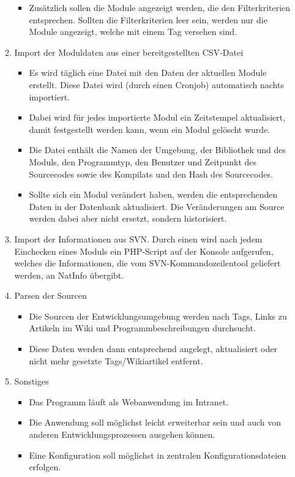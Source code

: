 \begin{enumerate}[itemsep=0em,partopsep=0em,parsep=0em,topsep=0em]
\begin{enumerate}
\begin{itemize}
		\item Zusätzlich sollen die Module angezeigt werden, die den Filterkriterien entsprechen. Sollten die Filterkriterien leer sein, werden nur die Module angezeigt, welche mit einem Tag versehen sind.
		\end{itemize}
	\item Import der Moduldaten aus einer bereitgestellten \acs{CSV}-Datei
		\begin{itemize}
		\item Es wird täglich eine Datei mit den Daten der aktuellen Module erstellt. Diese Datei wird (durch einen Cronjob) automatisch nachts importiert.
		\item Dabei wird für jedes importierte Modul ein Zeitstempel aktualisiert, damit festgestellt werden kann, wenn ein Modul gelöscht wurde.
		\item Die Datei enthält die Namen der Umgebung, der Bibliothek und des Moduls, den Programmtyp, den Benutzer und Zeitpunkt des Sourcecodes sowie des Kompilats und den Hash des Sourcecodes.
		\item Sollte sich ein Modul verändert haben, werden die entsprechenden Daten in der Datenbank aktualisiert. Die Veränderungen am Source werden dabei aber nicht ersetzt, sondern historisiert.
		\end{itemize}
	\item Import der Informationen aus SVN. Durch einen  wird nach jedem Einchecken eines Moduls ein \acs{PHP}-Script auf der Konsole aufgerufen, welches die Informationen, die vom SVN-Kommandozeilentool geliefert werden, an NatInfo übergibt.
	\item Parsen der Sourcen
		\begin{itemize}
		\item Die Sourcen der Entwicklungsumgebung werden nach Tags, Links zu Artikeln im Wiki und Programmbeschreibungen durchsucht.
		\item Diese Daten werden dann entsprechend angelegt, aktualisiert oder nicht mehr gesetzte Tags/Wikiartikel entfernt.
		\end{itemize}
	\item Sonstiges
		\begin{itemize}
		\item Das Programm läuft als Webanwendung im Intranet.
		\item Die Anwendung soll möglichst leicht erweiterbar sein und auch von anderen Entwicklungsprozessen ausgehen können.
		\item Eine Konfiguration soll möglichst in zentralen Konfigurationsdateien erfolgen.
		\end{itemize}
	\end{enumerate}
\end{enumerate}

